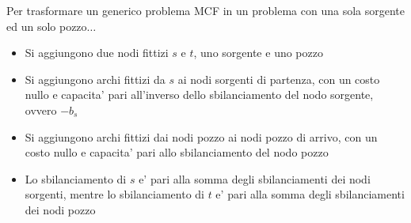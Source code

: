 Per trasformare un generico problema MCF in un problema con una sola sorgente ed un solo pozzo$ \dots $
\begin{itemize}
  \item Si aggiungono due nodi fittizi $s$ e $t$, uno sorgente e uno pozzo
  \item Si aggiungono archi fittizi  da $s$ ai nodi sorgenti di partenza, con un costo nullo e capacita' pari all'inverso dello sbilanciamento del nodo sorgente, ovvero $-b_s$
  \item Si aggiungono archi fittizi dai nodi pozzo ai nodi pozzo di arrivo, con un costo nullo e capacita' pari allo sbilanciamento del nodo pozzo
  \item Lo sbilanciamento di $s$ e' pari alla somma degli sbilanciamenti dei nodi sorgenti, mentre lo sbilanciamento di $t$ e' pari alla somma degli sbilanciamenti dei nodi pozzo
\end{itemize}

